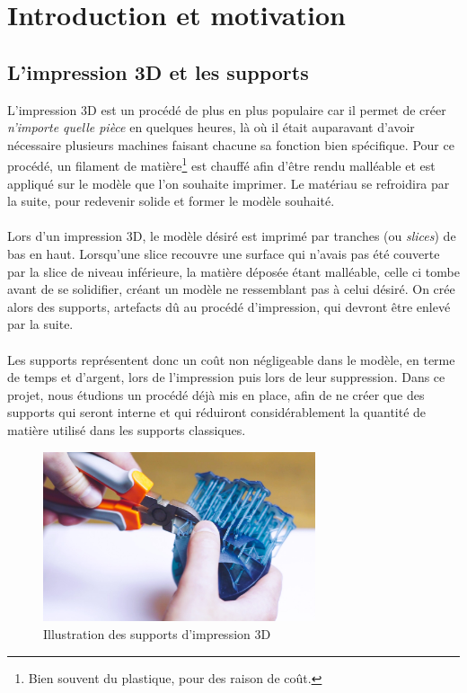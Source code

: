 \documentclass[11pt]{article}
\begin{document}
\tableofcontents

\newpage

\section{Introduction et motivation}

\subsection{L'impression 3D et les supports}
L'impression 3D est un procédé de plus en plus populaire car il permet de créer {\it n'importe quelle pièce} en quelques heures, là où il était auparavant d'avoir nécessaire plusieurs machines faisant chacune sa fonction bien spécifique. Pour ce procédé, un filament de matière\footnote{Bien souvent du plastique, pour des raison de coût.} est chauffé afin d'être rendu malléable et est appliqué sur le modèle que l'on souhaite imprimer. Le matériau se refroidira par la suite, pour redevenir solide et former le modèle souhaité. 

\paragraph*{}

Lors d'un impression 3D, le modèle désiré est imprimé par tranches (ou {\it slices}) de bas en haut. Lorsqu'une slice recouvre une surface qui n'avais pas été couverte par la slice de niveau inférieure, la matière déposée étant malléable, celle ci tombe avant de se solidifier, créant un modèle ne ressemblant pas à celui désiré. On crée alors des supports, artefacts dû au procédé d'impression, qui devront être enlevé par la suite.

\paragraph*{}
Les supports représentent donc un coût non négligeable dans le modèle, en terme de temps et d'argent, lors de l'impression puis lors de leur suppression. Dans ce projet, nous étudions un procédé déjà mis en place, afin de ne créer que des supports qui seront interne et qui réduiront considérablement la quantité de matière utilisé dans les supports classiques.

\newpage
\begin{figure}[h]
\centering
\includegraphics[height=5cm]{illustration-supports}
\caption{Illustration des supports d'impression 3D}
\end{figure}
\end{document}
